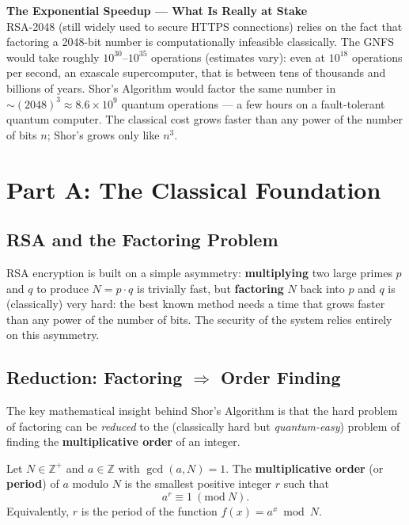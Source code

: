 \documentclass[a4paper,11pt]{article}
\newcommand{\Mod}[1]{\ (\mathrm{mod}\ #1)}
\begin{document}
\begin{warningbox}
\textbf{The Exponential Speedup — What Is Really at Stake}\\[4pt]
RSA-2048 (still widely used to secure HTTPS connections) relies on the fact that
factoring a 2048-bit number is computationally infeasible classically.
The GNFS would take roughly $10^{30}$--$10^{35}$ operations (estimates vary): even at
$10^{18}$ operations per second, an exascale supercomputer, that is between tens of
thousands and billions of years.  Shor's Algorithm would factor the same
number in $\sim\!(2048)^3 \approx 8.6\times10^9$ quantum operations — a few
hours on a fault-tolerant quantum computer.  The classical cost grows faster than
any power of the number of bits $n$; Shor's grows only like $n^3$.
\end{warningbox}

\section{Part A: The Classical Foundation}

\subsection{RSA and the Factoring Problem}

RSA encryption is built on a simple asymmetry: \textbf{multiplying} two large
primes $p$ and $q$ to produce $N = p\cdot q$ is trivially fast, but
\textbf{factoring} $N$ back into $p$ and $q$ is (classically) very hard: the
best known method needs a time that grows faster than any power of the number of bits. The security of the system relies entirely on this asymmetry.

\subsection{Reduction: Factoring $\Rightarrow$ Order Finding}

The key mathematical insight behind Shor's Algorithm is that the hard problem
of factoring can be \emph{reduced} to the (classically hard but
\emph{quantum-easy}) problem of finding the \textbf{multiplicative order} of
an integer.

\begin{defbox}
Let $N \in \mathbb{Z}^+$ and $a \in \mathbb{Z}$ with $\gcd(a, N) = 1$.
The \textbf{multiplicative order} (or \textbf{period}) of $a$ modulo $N$ is
the smallest positive integer $r$ such that
\[
    a^r \equiv 1 \Mod{N}.
\]
Equivalently, $r$ is the period of the function $f(x) = a^x \bmod N$.
\end{defbox}
\end{document}
